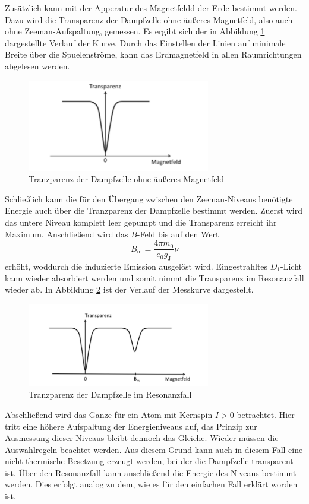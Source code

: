 Zusätzlich kann mit der Apperatur des Magnetfeldd der Erde bestimmt werden. Dazu wird die Transparenz der Dampfzelle ohne äußeres Magnetfeld, also auch ohne Zeeman-Aufspaltung, gemessen.
Es ergibt sich der in Abbildung \ref{abb:abb6} dargestellte Verlauf der Kurve. Durch das Einstellen der Linien auf minimale Breite über die Spuelenströme, kann das Erdmagnetfeld in allen
Raumrichtungen abgelesen werden.

\begin{figure}[H]
	\centering
	\includegraphics[width=8cm]{abb6.jpg}
	\caption{Tranzparenz der Dampfzelle ohne äußeres Magnetfeld \cite{V21}}
	\label{abb:abb6}
\end{figure}

Schließlich kann die für den Übergang zwischen den Zeeman-Niveaus benötigte Energie auch über die Tranzparenz der Dampfzelle bestimmt werden. Zuerst wird das untere Niveau komplett leer gepumpt und die Transparenz
erreicht ihr Maximum. Anschließend wird das $B$-Feld bis auf den Wert
\begin{equation}
  B_\text{m}=\frac{4\pi m_0}{e_0g_\text{J}}\nu
\end{equation}
erhöht, woddurch die induzierte Emission ausgelöst wird. Eingestrahltes $D_1$-Licht kann wieder absorbiert werden und somit nimmt die Transparenz im Resonanzfall wieder ab.
In Abbildung \ref{abb:abb7} ist der Verlauf der Messkurve dargestellt.

\begin{figure}[H]
	\centering
	\includegraphics[width=8cm]{abb7.jpg}
	\caption{Tranzparenz der Dampfzelle im Resonanzfall \cite{V21}}
	\label{abb:abb7}
\end{figure}

Abschließend wird das Ganze für ein Atom mit Kernspin $I>0$ betrachtet. Hier tritt eine höhere Aufspaltung der Energieniveaus auf, das Prinzip zur Ausmessung dieser Niveaus bleibt dennoch das Gleiche.
Wieder müssen die Auswahlregeln beachtet werden. Aus diesem Grund kann auch in diesem Fall eine nicht-thermische Besetzung erzeugt werden, bei der die Dampfzelle transparent ist. Über den Resonanzfall kann
anschließend die Energie des Niveaus bestimmt werden. Dies erfolgt analog zu dem, wie es für den einfachen Fall erklärt worden ist.

